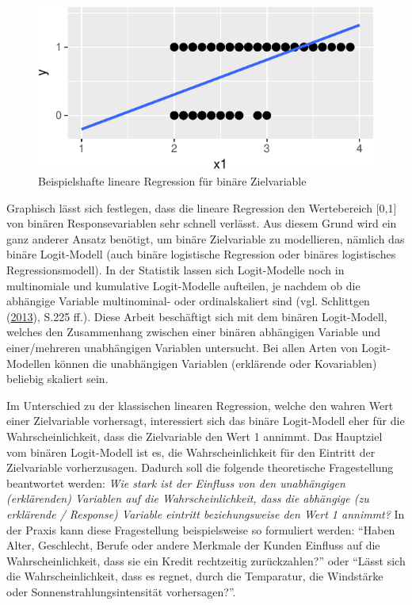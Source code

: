 \documentclass[12pt,]{article}
\begin{document}
\begin{figure}[h]

{\centering \includegraphics{logisticRegression_files/figure-latex/unnamed-chunk-1-1} 

}

\caption{Beispielshafte lineare Regression für binäre Zielvariable}\label{fig:unnamed-chunk-1}
\end{figure}

Graphisch lässt sich festlegen, dass die lineare Regression den
Wertebereich {[}0,1{]} von binären Responsevariablen sehr schnell
verlässt. Aus diesem Grund wird ein ganz anderer Ansatz benötigt, um
binäre Zielvariable zu modellieren, nämlich das binäre Logit-Modell
(auch binäre logistische Regression oder binäres logistisches
Regressionsmodell). In der Statistik lassen sich Logit-Modelle noch in
multinomiale und kumulative Logit-Modelle aufteilen, je nachdem ob die
abhängige Variable multinominal- oder ordinalskaliert sind (vgl.
Schlittgen
(\protect\hyperlink{ref-schlittgen2013regressionsanalysen}{2013}), S.225
ff.). Diese Arbeit beschäftigt sich mit dem binären Logit-Modell,
welches den Zusammenhang zwischen einer binären abhängigen Variable und
einer/mehreren unabhängigen Variablen untersucht. Bei allen Arten von
Logit-Modellen können die unabhängigen Variablen (erklärende oder
Kovariablen) beliebig skaliert sein.

Im Unterschied zu der klassischen linearen Regression, welche den wahren
Wert einer Zielvariable vorhersagt, interessiert sich das binäre
Logit-Modell eher für die Wahrscheinlichkeit, dass die Zielvariable den
Wert 1 annimmt. Das Hauptziel vom binären Logit-Modell ist es, die
Wahrscheinlichkeit für den Eintritt der Zielvariable vorherzusagen.
Dadurch soll die folgende theoretische Fragestellung beantwortet werden:
\emph{Wie stark ist der Einfluss von den unabhängigen (erklärenden)
Variablen auf die Wahrscheinlichkeit, dass die abhängige (zu erklärende
/ Response) Variable eintritt beziehungsweise den Wert 1 annimmt?} In
der Praxis kann diese Fragestellung beispielsweise so formuliert werden:
``Haben Alter, Geschlecht, Berufe oder andere Merkmale der Kunden
Einfluss auf die Wahrscheinlichkeit, dass sie ein Kredit rechtzeitig
zurückzahlen?'' oder ``Lässt sich die Wahrscheinlichkeit, dass es
regnet, durch die Temparatur, die Windstärke oder
Sonnenstrahlungsintensität vorhersagen?''.
\end{document}
